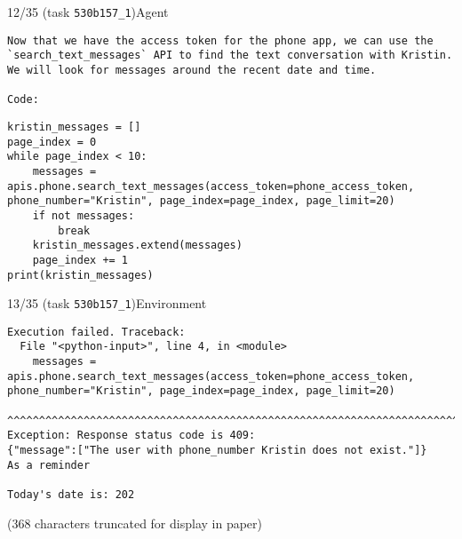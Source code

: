 \begin{minipage}{0.95\linewidth}
\begin{assistant_message_box}{{12/35 (task \texttt{530b157\_1})\hfill Agent}}
\scriptsize
\begin{Verbatim}[breaklines]
Now that we have the access token for the phone app, we can use the `search_text_messages` API to find the text conversation with Kristin. We will look for messages around the recent date and time.

Code:
\end{Verbatim}
\begin{tcolorbox}[colback=codebgcolor,boxrule=0pt]\begin{Verbatim}[breaklines]
kristin_messages = []
page_index = 0
while page_index < 10:
    messages = apis.phone.search_text_messages(access_token=phone_access_token, phone_number="Kristin", page_index=page_index, page_limit=20)
    if not messages:
        break
    kristin_messages.extend(messages)
    page_index += 1
print(kristin_messages)
\end{Verbatim}
\end{tcolorbox}\end{assistant_message_box}
\end{minipage}

\hspace*{8mm}%
\begin{minipage}{0.95\linewidth}
\begin{user_message_box}{{13/35 (task \texttt{530b157\_1})\hfill Environment}}
\scriptsize
\begin{Verbatim}[breaklines]
Execution failed. Traceback:
  File "<python-input>", line 4, in <module>
    messages = apis.phone.search_text_messages(access_token=phone_access_token, phone_number="Kristin", page_index=page_index, page_limit=20)
               ^^^^^^^^^^^^^^^^^^^^^^^^^^^^^^^^^^^^^^^^^^^^^^^^^^^^^^^^^^^^^^^^^^^^^^^^^^^^^^^^^^^^^^^^^^^^^^^^^^^^^^^^^^^^^^^^^^^^^^^^^^^^^^
Exception: Response status code is 409:
{"message":["The user with phone_number Kristin does not exist."]}
As a reminder

Today's date is: 202
\end{Verbatim}
(368 characters truncated for display in paper)\end{user_message_box}
\end{minipage}

